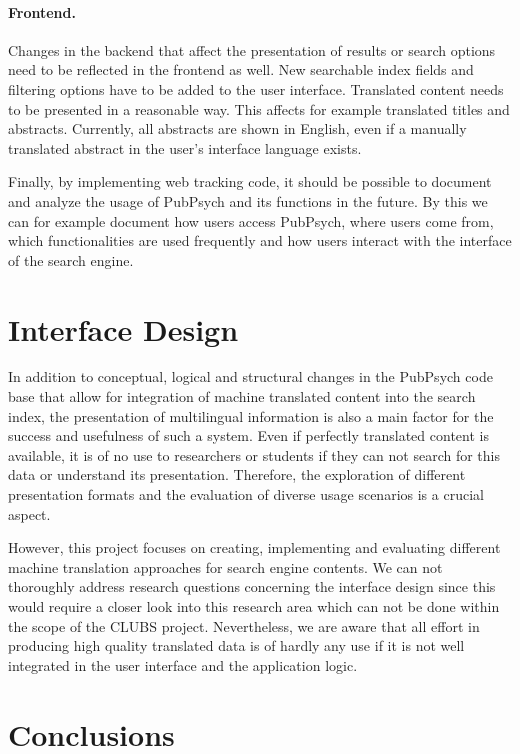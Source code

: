 \documentclass[a4paper,11pt]{article}
\begin{document}
\paragraph{Frontend.}
Changes in the backend that affect the presentation of results or search options need to be reflected in the frontend as well. New searchable index fields and filtering options have to be added to the user interface. Translated content needs to be presented in a reasonable way. This affects for example translated titles and abstracts. Currently, all abstracts are shown in English, even if a manually translated abstract in the user's interface language exists.

Finally, by implementing web tracking code, it should be possible to document and analyze the usage of PubPsych and its functions in the future. By this we can for example document how users access PubPsych, where users come from, which functionalities are used frequently and how users interact with the interface of the search engine.

\section{Interface Design}
\label{s:interface_design}

In addition to conceptual, logical and structural changes in the PubPsych code base that allow for integration of machine translated content into the search index, the presentation of multilingual information is also a main factor for the success and usefulness of such a system. Even if perfectly translated content is available, it is of no use to researchers or students if they can not search for this data or understand its presentation. Therefore, the exploration of different presentation formats and the evaluation of diverse usage scenarios is a crucial aspect.

However, this project focuses on creating, implementing and evaluating different machine translation approaches for search engine contents. We can not thoroughly address research questions concerning the interface design since this would require a closer look into this research area which can not be done within the scope of the CLUBS project. Nevertheless, we are aware that all effort in producing high quality translated data is of hardly any use if it is not well integrated in the user interface and the application logic.


\section{Conclusions}
\label{s:conclusions}
\end{document}
